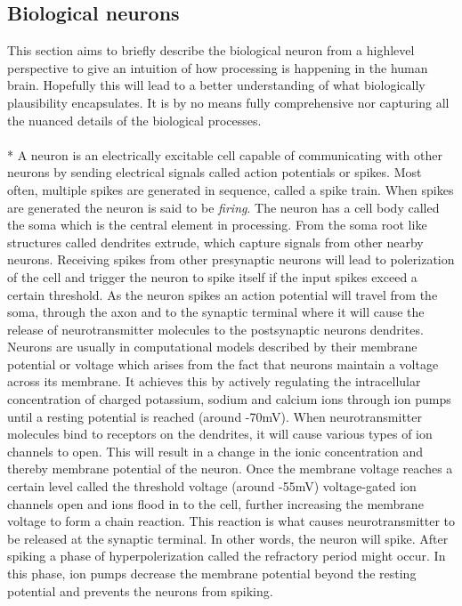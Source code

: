 \documentclass[a4paper,11pt]{article} %
\begin{document}
\subsection{Biological neurons} \label{sec:neurons}
This section aims to briefly describe the biological neuron from a highlevel perspective to give an intuition of how processing is happening in the human brain. Hopefully this will lead to a better understanding of what biologically plausibility encapsulates. It is by no means fully comprehensive nor capturing all the nuanced details of the biological processes. \\
\\*
A neuron is an electrically excitable cell capable of communicating with other neurons by sending electrical signals called action potentials or spikes. Most often, multiple spikes are generated in sequence, called a spike train. When spikes are generated the neuron is said to be \textit{firing}. The neuron has a cell body called the soma which is the central element in processing. From the soma root like structures called dendrites extrude, which capture signals from other nearby neurons. Receiving spikes from other presynaptic neurons will lead to polerization of the cell and trigger the neuron to spike itself if the input spikes exceed a certain threshold. As the neuron spikes an action potential will travel from the soma, through the axon and to the synaptic terminal where it will cause the release of neurotransmitter molecules to the postsynaptic neurons dendrites. Neurons are usually in computational models described by their membrane potential or voltage which arises from the fact that neurons maintain a voltage across its membrane. It achieves this by actively regulating the intracellular concentration of charged potassium, sodium and calcium ions through ion pumps until a resting potential is reached (around -70mV). When neurotransmitter molecules bind to receptors on the dendrites, it will cause various types of ion channels to open. This will result in a change in the ionic concentration and thereby membrane potential of the neuron. Once the membrane voltage reaches a certain level called the threshold voltage (around -55mV) voltage-gated ion channels open and ions flood in to the cell, further increasing the membrane voltage to form a chain reaction. This reaction is what causes neurotransmitter to be released at the synaptic terminal. In other words, the neuron will spike. After spiking a phase of hyperpolerization called the refractory period might occur. In this phase, ion pumps decrease the membrane potential beyond the resting potential and prevents the neurons from spiking. \\
\end{document}
